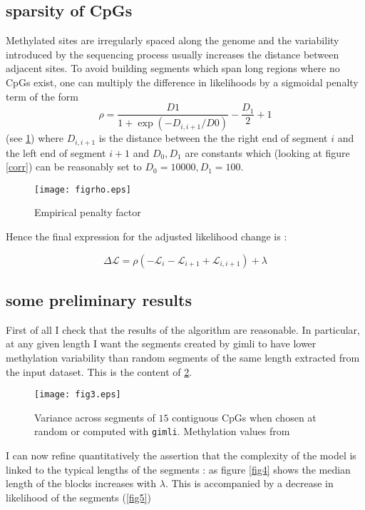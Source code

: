 \documentclass[12pt]{amsart}
\newcommand{\lik}{\ensuremath{\mathcal{L}}}
\newcommand{\gimli}{\texttt{gimli}}
\begin{document}
\subsection{sparsity of CpGs}

Methylated sites are irregularly spaced along the genome and the variability 
introduced by the sequencing process usually increases the distance 
between adjacent sites.
To avoid building segments which span long regions where no CpGs exist, one 
can multiply the difference in likelihoods by a sigmoidal penalty term of the
form \[\rho=\frac{D1}{1+\exp(-D_{i,i+1}/D0)}-\frac{D_1}{2}+1\] (see \ref{figrho}) 
where $D_{i,i+1}$ is the distance 
between the the right end of segment $i$ and the left end of segment $i+1$ and 
$D_0,D_1$ are constants which (looking at figure \ref{corr}) can be reasonably 
set to $D_0=10000,D_1=100$. 

\begin{figure}\label{figrho}
\texttt{[image: figrho.eps]}
\caption{Empirical penalty factor \rho}
\end{figure}





Hence the final expression for the adjusted likelihood change is :

\begin{equation}
\Delta \lik = \rho ( -\mathcal{L}_i-\mathcal{L}_{i+1}+\mathcal{L}_{i,i+1} )  +\lambda
\end{equation}


\subsection{some preliminary results}

First of all I check that the results of the algorithm are reasonable.
In particular, at any given length I want the segments created by gimli to have lower methylation
variability than random segments of the same length extracted from the input dataset. This is the content of
\ref{fig3}.

\begin{figure}\label{fig3}
\texttt{[image: fig3.eps]}
\caption{Variance across segments of $15$ contiguous CpGs when chosen at random or 
computed with \gimli{}. Methylation values from }
\end{figure}

I can now refine quantitatively the assertion that the complexity of the model
is linked to the typical lengths of the segments : as figure \ref{fig4} 
shows the median length of the blocks increases with $\lambda$. This is 
accompanied by a decrease in likelihood of the segments (\ref{fig5})
\end{document}
